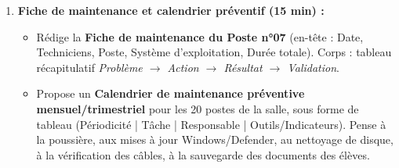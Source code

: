\documentclass[11pt]{article}
\begin{document}
\begin{enumerate}
    \item \textbf{Fiche de maintenance et calendrier préventif (15 min) :}
    \begin{itemize}
        \item Rédige la \textbf{Fiche de maintenance du Poste n°07} (en-tête : Date, Techniciens, Poste, Système d'exploitation, Durée totale). Corps : tableau récapitulatif \textit{Problème $\rightarrow$ Action $\rightarrow$ Résultat $\rightarrow$ Validation}.
        \item Propose un \textbf{Calendrier de maintenance préventive mensuel/trimestriel} pour les 20 postes de la salle, sous forme de tableau (Périodicité | Tâche | Responsable | Outils/Indicateurs). Pense à la poussière, aux mises à jour Windows/Defender, au nettoyage de disque, à la vérification des câbles, à la sauvegarde des documents des élèves.
    \end{itemize}
\end{enumerate}
\end{document}

